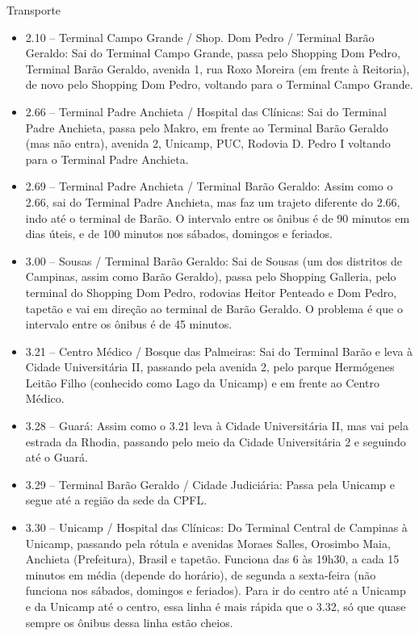 \begin{story}{Transporte}
\begin{itemize}
\item 2.10 -- Terminal Campo Grande / Shop. Dom Pedro / Terminal Barão Geraldo: Sai do Terminal Campo Grande, passa pelo Shopping Dom Pedro, Terminal Barão Geraldo, avenida 1, rua Roxo Moreira (em frente à Reitoria), de novo pelo Shopping Dom Pedro, voltando para o Terminal Campo Grande.

\item 2.66 -- Terminal Padre Anchieta / Hospital das Clínicas: Sai do Terminal Padre Anchieta, passa pelo Makro, em frente ao Terminal Barão Geraldo (mas não entra), avenida 2, Unicamp, PUC, Rodovia D. Pedro I voltando para o Terminal Padre Anchieta.

\item 2.69 -- Terminal Padre Anchieta / Terminal Barão Geraldo: Assim como o 2.66, sai do Terminal Padre Anchieta, mas faz um trajeto diferente do 2.66, indo até o terminal de Barão. O intervalo entre os ônibus é de 90 minutos em dias úteis, e de 100 minutos nos sábados, domingos e feriados.

\item 3.00 -- Sousas / Terminal Barão Geraldo: Sai de Sousas (um dos distritos de Campinas, assim como Barão Geraldo), passa pelo Shopping Galleria, pelo terminal do Shopping Dom Pedro, rodovias Heitor Penteado e Dom Pedro, tapetão e vai em direção ao terminal de Barão Geraldo. O problema é que o intervalo entre os ônibus é de 45 minutos.

\item 3.21 -- Centro Médico / Bosque das Palmeiras: Sai do Terminal Barão e leva à Cidade Universitária II, passando pela avenida 2, pelo parque Hermógenes Leitão Filho (conhecido como Lago da Unicamp) e em frente ao Centro Médico.

\item 3.28 -- Guará: Assim como o 3.21 leva à Cidade Universitária II, mas vai pela estrada da Rhodia, passando pelo meio da Cidade Universitária 2 e seguindo até o Guará.

\item 3.29 -- Terminal Barão Geraldo / Cidade Judiciária: Passa pela Unicamp e segue até a região da sede da CPFL.

\item 3.30 -- Unicamp / Hospital das Clínicas: Do Terminal Central de Campinas à Unicamp, passando pela rótula e avenidas Moraes Salles, Orosimbo Maia, Anchieta (Prefeitura), Brasil e tapetão. Funciona das 6 às 19h30, a cada 15 minutos em média (depende do horário), de segunda a sexta-feira (não funciona nos sábados, domingos e feriados). Para ir do centro até a Unicamp e da Unicamp até o centro, essa linha é mais rápida que o 3.32, só que quase sempre os ônibus dessa linha estão cheios.


\end{itemize}
\end{story}
